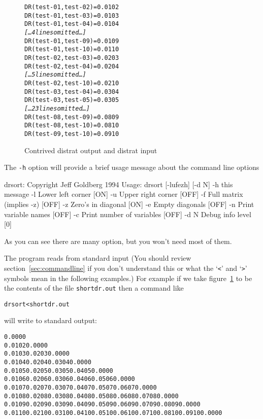 \documentclass[%
	11pt,
        a4paper,
        twoside]{workrep}
\newcommand*{\prg}[1]{\textsf{#1}}		%
\newcommand*{\file}[1]{\texttt{#1}}		%
\newcommand*{\opt}[1]{\texttt{#1}}		%
\begin{document}
\begin{figure}
\newcommand{\omitted}[1]{\vspace{.5ex}%
   {\normalfont\itshape [\ldots #1 lines omitted\ldots]}
   \vspace{.5ex}}
\caption{Contrived \prg{distrat} output and \prg{distrat} input}%
   \label{fig:droutput}
\begin{alltt}
DR(test-01, test-02) = 0.0102
DR(test-01, test-03) = 0.0103
DR(test-01, test-04) = 0.0104
\omitted4
DR(test-01, test-09) = 0.0109
DR(test-01, test-10) = 0.0110
DR(test-02, test-03) = 0.0203
DR(test-02, test-04) = 0.0204
\omitted5
DR(test-02, test-10) = 0.0210
DR(test-03, test-04) = 0.0304
DR(test-03, test-05) = 0.0305
\omitted{23}
DR(test-08, test-09) = 0.0809
DR(test-08, test-10) = 0.0810
DR(test-09, test-10) = 0.0910
\end{alltt}
\end{figure}

The \opt{-h} option will provide a brief usage message about the command
line options

\begin{verbatimtab}
drsort: Copyright Jeff Goldberg 1994
Usage:
	drsort [-lufezh] [-d N]
		-h	this message
		-l	Lower left corner [ON]
		-u	Upper right corner [OFF]
		-f	Full matrix (implies -z) [OFF]
		-z	Zero's in diagonal [ON]
		-e	Empty diagonals [OFF]
		-n	Print variable names [OFF]
		-c	Print number of variables [OFF]
		-d N	Debug info level [0]
\end{verbatimtab}

As you can see there are many option, but you won't need most of them.

The program reads from standard input (You should review
section~\ref{sec:commandline} if you don't understand this or what
the `\verb|<|' and `\verb|>|' symbols mean in the following
examples.)  For example if we take figure~\ref{fig:droutput} to be
the contents of the file \file{shortdr.out} then a command like
\begin{alltt}
  drsort < shortdr.out
\end{alltt}
will write to standard output:
\begin{alltt}\small
 0.0000
 0.0102 0.0000
 0.0103 0.0203 0.0000
 0.0104 0.0204 0.0304 0.0000
 0.0105 0.0205 0.0305 0.0405 0.0000
 0.0106 0.0206 0.0306 0.0406 0.0506 0.0000
 0.0107 0.0207 0.0307 0.0407 0.0507 0.0607 0.0000
 0.0108 0.0208 0.0308 0.0408 0.0508 0.0608 0.0708 0.0000
 0.0109 0.0209 0.0309 0.0409 0.0509 0.0609 0.0709 0.0809 0.0000
 0.0110 0.0210 0.0310 0.0410 0.0510 0.0610 0.0710 0.0810 0.0910 0.0000
\end{alltt}
\end{document}

